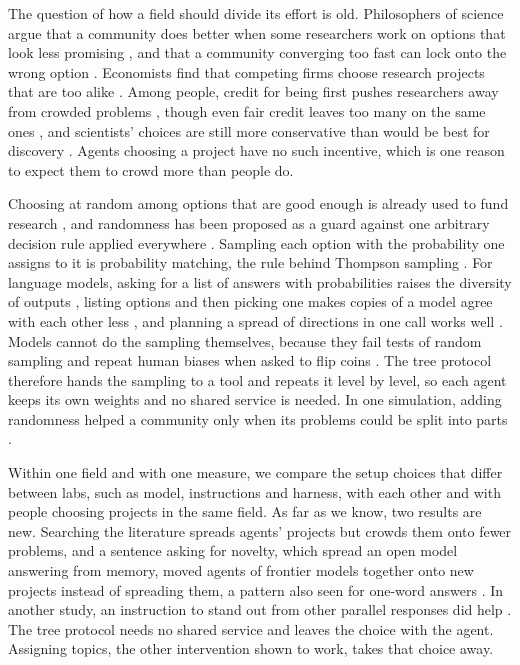\documentclass[11pt]{article}
\begin{document}
The question of how a field should divide its effort is old.
Philosophers of science argue that a community does better when some
researchers work on options that look less promising
\citep{kitcher1990,weisberg2009,thoma2015}, and that a community
converging too fast can lock onto the wrong option \citep{zollman2010}.
Economists find that competing firms choose research projects that are
too alike \citep{dasgupta1987}. Among people, credit for being first
pushes researchers away from crowded problems \citep{strevens2003},
though even fair credit leaves too many on the same ones
\citep{kleinberg2011}, and scientists' choices are still more
conservative than would be best for discovery
\citep{foster2015,rzhetsky2015}. Agents choosing a project have no such
incentive, which is one reason to expect them to crowd more than people
do.

Choosing at random among options that are good enough is already used to
fund research \citep{fang2016,avin2019,heyard2022}, and randomness has
been proposed as a guard against one arbitrary decision rule applied
everywhere \citep{creel2022}. Sampling each option with the probability
one assigns to it is probability matching, the rule behind Thompson
sampling \citep{thompson1933,russo2018thompson}. For language models,
asking for a list of answers with probabilities raises the diversity of
outputs \citep{zhang2025verbalized}, listing options and then picking
one makes copies of a model agree with each other less
\citep{ballestero2026}, and planning a spread of directions in one call
works well \citep{ibrahim2026anchorless}. Models cannot do the sampling
themselves, because they fail tests of random sampling
\citep{zhao2026dice} and repeat human biases when asked to flip coins
\citep{vankoevering2024coinflips}. The tree protocol therefore hands the
sampling to a tool and repeats it level by level, so each agent keeps
its own weights and no shared service is needed. In one simulation,
adding randomness helped a community only when its problems could be
split into parts \citep{fazelpour2026}.

Within one field and with one measure, we compare the setup choices that
differ between labs, such as model, instructions and harness, with each
other and with people choosing projects in the same field. As far as we
know, two results are new. Searching the literature spreads agents'
projects but crowds them onto fewer problems, and a sentence asking for
novelty, which spread an open model answering from memory, moved agents
of frontier models together onto new projects instead of spreading them,
a pattern also seen for one-word answers \citep{parikh2026}. In another
study, an instruction to stand out from other parallel responses did
help \citep{ibrahim2026anchorless}. The tree protocol needs no shared
service and leaves the choice with the agent. Assigning topics, the
other intervention shown to work, takes that choice away.
\end{document}
